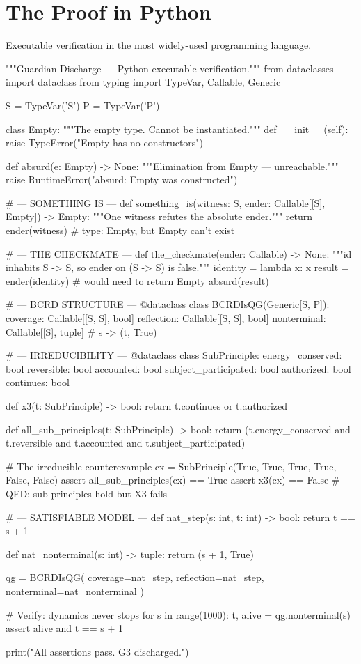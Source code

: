 \documentclass[11pt,a4paper]{article}
\theoremstyle{definition}
\theoremstyle{remark}
\begin{document}
\section{The Proof in Python}\label{sec:python}

Executable verification in the most widely-used programming language.

\begin{pythoncode}
"""Guardian Discharge — Python executable verification."""
from dataclasses import dataclass
from typing import TypeVar, Callable, Generic

S = TypeVar('S')
P = TypeVar('P')

class Empty:
    """The empty type. Cannot be instantiated."""
    def __init__(self):
        raise TypeError("Empty has no constructors")

def absurd(e: Empty) -> None:
    """Elimination from Empty — unreachable."""
    raise RuntimeError("absurd: Empty was constructed")

# --- SOMETHING IS ---
def something_is(witness: S, ender: Callable[[S], Empty]) -> Empty:
    """One witness refutes the absolute ender."""
    return ender(witness)  # type: Empty, but Empty can't exist

# --- THE CHECKMATE ---
def the_checkmate(ender: Callable) -> None:
    """id inhabits S -> S, so ender on (S -> S) is false."""
    identity = lambda x: x
    result = ender(identity)  # would need to return Empty
    absurd(result)

# --- BCRD STRUCTURE ---
@dataclass
class BCRDIsQG(Generic[S, P]):
    coverage: Callable[[S, S], bool]
    reflection: Callable[[S, S], bool]
    nonterminal: Callable[[S], tuple]  # s -> (t, True)

# --- IRREDUCIBILITY ---
@dataclass
class SubPrinciple:
    energy_conserved: bool
    reversible: bool
    accounted: bool
    subject_participated: bool
    authorized: bool
    continues: bool

def x3(t: SubPrinciple) -> bool:
    return t.continues or t.authorized

def all_sub_principles(t: SubPrinciple) -> bool:
    return (t.energy_conserved and t.reversible
            and t.accounted and t.subject_participated)

# The irreducible counterexample
cx = SubPrinciple(True, True, True, True, False, False)
assert all_sub_principles(cx) == True
assert x3(cx) == False
# QED: sub-principles hold but X3 fails

# --- SATISFIABLE MODEL ---
def nat_step(s: int, t: int) -> bool:
    return t == s + 1

def nat_nonterminal(s: int) -> tuple:
    return (s + 1, True)

qg = BCRDIsQG(
    coverage=nat_step,
    reflection=nat_step,
    nonterminal=nat_nonterminal
)

# Verify: dynamics never stops
for s in range(1000):
    t, alive = qg.nonterminal(s)
    assert alive and t == s + 1

print("All assertions pass. G3 discharged.")
\end{pythoncode}
\end{document}
